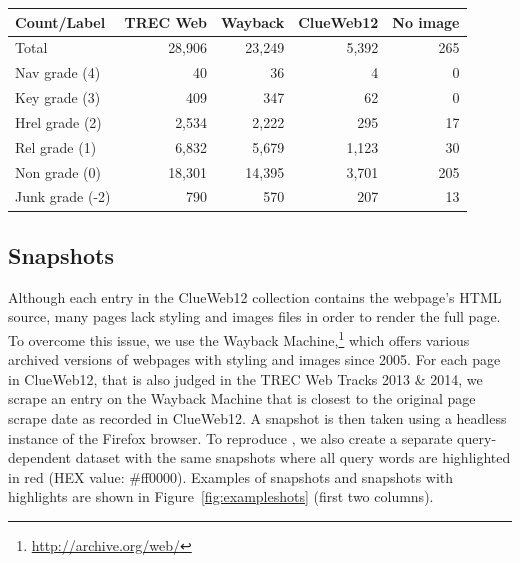 \begin{table}[h]
  \label{tab:countsources}
  \begin{tabular}{ l  @{}r  r  r  r }
  \toprule
    Count/Label & TREC Web & Wayback & ClueWeb12 & \mbox{}\hspace*{-.15cm}No image\\
    \midrule
    Total & 28,906 & 23,249 & 5,392 & 265 \\
    Nav grade (4) & 40 & 36 & 4 & 0\\
    Key grade (3) & 409 & 347 & 62 & 0\\
    Hrel grade (2) & 2,534 & 2,222 & 295 & 17 \\
    Rel grade (1) & 6,832 & 5,679 & 1,123 & 30\\
    Non grade (0) & 18,301 & 14,395 & 3,701 & 205 \\
    Junk grade (-2) & 790 & 570 & 207 & 13\\
    \bottomrule
  \end{tabular} 
\end{table}


\subsection{Snapshots} \label{sec:screenshotsec}
Although each entry in the ClueWeb12 collection contains the webpage's HTML source, many pages lack styling and images files in order to render the full page.
To overcome this issue, we use the Wayback Machine,\footnote{\url{http://archive.org/web/}} which offers various archived versions of webpages with styling and images since 2005.
For each page in ClueWeb12, that is also judged in the TREC Web Tracks 2013 \& 2014,
we scrape an entry on the Wayback Machine that is closest to the original page scrape date as recorded in ClueWeb12.
A snapshot is then taken using a headless instance of the Firefox browser.
To reproduce \cite{fan2017learning}, we also create a separate query-dependent dataset with the same snapshots where all query words are highlighted in red (HEX value: \#ff0000).
Examples of snapshots and snapshots with highlights are shown in Figure~\ref{fig:exampleshots} (first two columns). 

